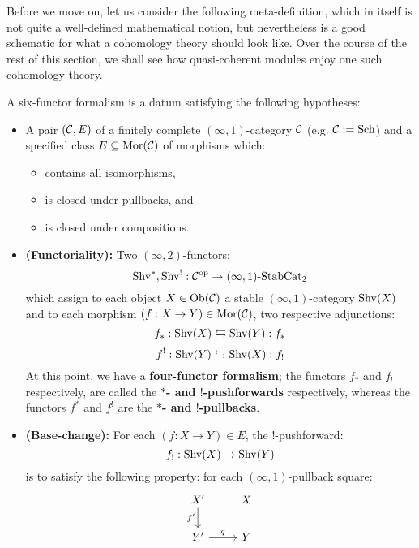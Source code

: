         Before we move on, let us consider the following meta-definition, which in itself is not quite a well-defined mathematical notion, but nevertheless is a good schematic for what a  cohomology theory should look like. Over the course of the rest of this section, we shall see how quasi-coherent modules enjoy one such cohomology theory.
        \begin{definition} \label{def: six_functor_formalisms}
            A six-functor formalism is a datum satisfying the following hypotheses:
            \begin{itemize}
                \item A pair $(\C, E)$ of a finitely complete $(\infty, 1)$-category $\C$ (e.g. $\C := \Sch$) and a specified class $E \subseteq \Mor(\C)$ of morphisms which:
                \begin{itemize}
                    \item contains all isomorphisms,
                    \item is closed under pullbacks, and
                    \item is closed under compositions.
                \end{itemize}
                \item \textbf{(Functoriality):} Two $(\infty, 2)$-functors:
                    $$\Shv^*, \Shv^!: \C^{\op} \to (\infty, 1)\-\Stab\Cat_2$$
                which assign to each object $X \in \Ob(\C)$ a stable $(\infty, 1)$-category $\Shv(X)$ and to each morphism $(f: X \to Y) \in \Mor(\C)$, two respective adjunctions:
                    $$f_*: \Shv(X) \leftrightarrows \Shv(Y): f_*$$
                    $$f^!: \Shv(Y) \leftrightarrows \Shv(X): f_!$$
                At this point, we have a \textbf{four-functor formalism}; the functors $f_*$ and $f_!$ respectively, are called the \textbf{$*$- and $!$-pushforwards} respectively, whereas the functors $f^*$ and $f^!$ are the \textbf{$*$- and $!$-pullbacks}. 
                \item \textbf{(Base-change):} For each $(f: X \to Y) \in E$, the $!$-pushforward:
                    $$f_!: \Shv(X) \to \Shv(Y)$$
                is to satisfy the following property: for each $(\infty, 1)$-pullback square:
                    $$
                        \begin{tikzcd}
                        {X'} & X \\
                        {Y'} & Y
                        \arrow["{f'}"', from=1-1, to=2-1]
                        \arrow["q", from=2-1, to=2-2]

\end{tikzcd}$$
\end{itemize}
\end{definition}
